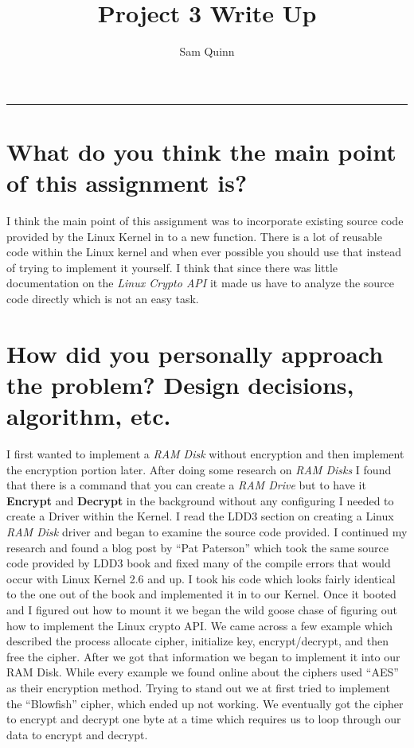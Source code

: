 \documentclass[letterpaper,10pt,notitlepage,fleqn]{article}
\title{Project 3 Write Up}
\author{Sam Quinn}
\begin{document}
\maketitle
\hrule

\section*{What do you think the main point of this assignment is?}
    I think the main point of this assignment was to incorporate existing source 
    code provided by the Linux Kernel in to a new function. There is a lot of reusable 
    code within the Linux kernel and when ever possible you should use that instead 
    of trying to implement it yourself. I think that since there was little documentation 
    on the \textit{Linux Crypto API} it made us have to analyze the source code 
    directly which is not an easy task.

\section*{How did you personally approach the problem? Design decisions, algorithm, etc.}
    I first wanted to implement a \textit{RAM Disk} without encryption and then implement 
    the encryption portion later. After doing some research on \textit{RAM Disks} 
    I found that there is a command that you can create a \textit{RAM Drive} but 
    to have it \textbf{Encrypt} and \textbf{Decrypt} in the background without any 
    configuring I needed to create a Driver within the Kernel. I read the LDD3 section 
    on creating a Linux \textit{RAM Disk} driver and began to examine the source 
    code provided. I continued my research and found a blog post by ``Pat Paterson'' 
    which took the same source code provided by LDD3 book and fixed many of the 
    compile errors that would occur with Linux Kernel 2.6 and up. I took his code 
    which looks fairly identical to the one out of the book and implemented it in 
    to our Kernel. Once it booted and I figured out how to mount it we began the 
    wild goose chase of figuring out how to implement the Linux crypto API. We came 
    across a few example which described the process allocate cipher, initialize 
    key, encrypt/decrypt, and then free the cipher. After we got that information 
    we began to implement it into our RAM Disk. While every example we found online 
    about the ciphers used ``AES'' as their encryption method. Trying to stand out 
    we at first tried to implement the ``Blowfish'' cipher, which ended up not working.
    We eventually got the cipher to encrypt and decrypt one byte at a time which 
    requires us to loop through our data to encrypt and decrypt.
\end{document}
